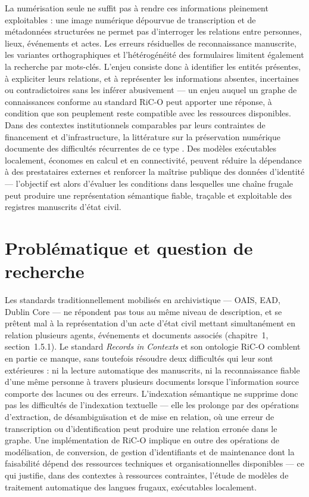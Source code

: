 La numérisation seule ne suffit pas à rendre ces informations pleinement exploitables : une image numérique dépourvue de transcription et de métadonnées structurées ne permet pas d'interroger les relations entre personnes, lieux, événements et actes.
Les erreurs résiduelles de reconnaissance manuscrite, les variantes orthographiques et l'hétérogénéité des formulaires limitent également la recherche par mots-clés.
L'enjeu consiste donc à identifier les entités présentes, à expliciter leurs relations, et à représenter les informations absentes, incertaines ou contradictoires sans les inférer abusivement --- un enjeu auquel un graphe de connaissances conforme au standard RiC-O \cite{icaegad2025rico11,clavaudica} peut apporter une réponse, à condition que son peuplement reste compatible avec les ressources disponibles.
Dans des contextes institutionnels comparables par leurs contraintes de financement et d'infrastructure, la littérature sur la préservation numérique documente des difficultés récurrentes de ce type \cite{masenyaFactorsThatInfluence2020,masenyaDigitalPreservationPractices2019}.
Des modèles exécutables localement, économes en calcul et en connectivité, peuvent réduire la dépendance à des prestataires externes et renforcer la maîtrise publique des données d'identité --- l'objectif est alors d'évaluer les conditions dans lesquelles une chaîne frugale peut produire une représentation sémantique fiable, traçable et exploitable des registres manuscrits d'état civil.

\section*{Problématique et question de recherche}

Les standards traditionnellement mobilisés en archivistique --- OAIS, EAD, Dublin Core --- ne répondent pas tous au même niveau de description, et se prêtent mal à la représentation d'un acte d'état civil mettant simultanément en relation plusieurs agents, événements et documents associés (chapitre~1, section~1.5.1).
Le standard \textit{Records in Contexts} et son ontologie RiC-O comblent en partie ce manque, sans toutefois résoudre deux difficultés qui leur sont extérieures : ni la lecture automatique des manuscrits, ni la reconnaissance fiable d'une même personne à travers plusieurs documents lorsque l'information source comporte des lacunes ou des erreurs.
L'indexation sémantique ne supprime donc pas les difficultés de l'indexation textuelle --- elle les prolonge par des opérations d'extraction, de désambiguïsation et de mise en relation, où une erreur de transcription ou d'identification peut produire une relation erronée dans le graphe.
Une implémentation de RiC-O implique en outre des opérations de modélisation, de conversion, de gestion d'identifiants et de maintenance dont la faisabilité dépend des ressources techniques et organisationnelles disponibles --- ce qui justifie, dans des contextes à ressources contraintes, l'étude de modèles de traitement automatique des langues frugaux, exécutables localement.

